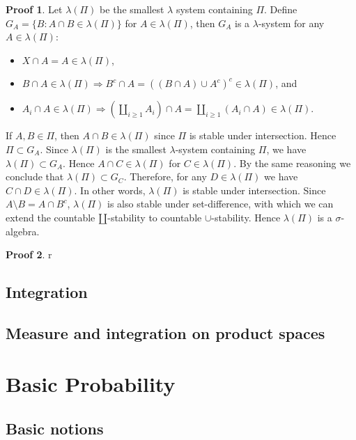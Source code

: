 \documentclass[hidelinks,11pt]{article}
\theoremstyle{definition}
\theoremstyle{dotless}
\newtheorem{prop}{Proof}[section]
\theoremstyle{remark}
\DeclareMathOperator{\1}{\mathbf{1}}
\begin{document}
\begin{prop}
Let $\lambda(\Pi)$ be the smallest $\lambda$ system containing $\Pi$. Define $G_A=\{B:A\cap B\in\lambda(\Pi)\}$ for $A\in\lambda(\Pi)$, then $G_A$ is a $\lambda$-system for any $A\in\lambda(\Pi)$:\begin{itemize}
    \item $X\cap A=A\in\lambda(\Pi)$,
    \item $B\cap A\in\lambda(\Pi)\Rightarrow B^c\cap A=((B\cap A)\cup A^c)^c\in\lambda(\Pi)$, and
    \item $A_i\cap A\in\lambda(\Pi)\Rightarrow(\amalg_{i\geq1}A_i)\cap A=\amalg_{i\geq1}(A_i\cap A)\in\lambda(\Pi)$.
\end{itemize}
If $A,B\in\Pi$, then $A\cap B\in\lambda(\Pi)$ since $\Pi$ is stable under intersection. Hence $\Pi\subset G_A$. Since $\lambda(\Pi)$ is the smallest $\lambda$-system containing $\Pi$, we have $\lambda(\Pi)\subset G_A$. Hence $A\cap C\in\lambda(\Pi)$ for $C\in\lambda(\Pi)$. By the same reasoning we conclude that $\lambda(\Pi)\subset G_C$. Therefore, for any $D\in\lambda(\Pi)$ we have $C\cap D\in\lambda(\Pi)$. In other words, $\lambda(\Pi)$ is stable under intersection.\medbreak
Since $A\setminus B=A\cap B^c$, $\lambda(\Pi)$ is also stable under set-difference, with which we can extend the countable $\amalg$-stability to countable $\cup$-stability. Hence $\lambda(\Pi)$ is a $\sigma$-algebra.
\end{prop}

\begin{prop}
r
\end{prop}

\subsection{Integration}

\subsection{Measure and integration on product spaces}

\section{Basic Probability}

\subsection{Basic notions}
\end{document}
